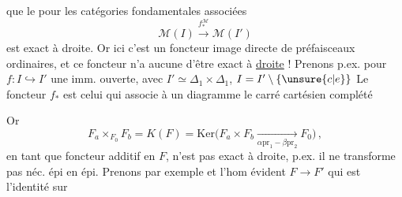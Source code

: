 que le  pour les catégories fondamentales associées
\[
\mathcal M(I)\xrightarrow{f_*^{\mathcal M}}\mathcal M(I')
\]
est exact à droite. Or ici c'est un foncteur image directe de préfaisceaux ordinaires, et ce foncteur n'a aucune  d'être exact à \uline{droite} !
\margin{$!\ \shortparallel$}
 
Prenons p.ex. pour $f:I\hookrightarrow I'$ une imm. ouverte, avec $I'\simeq\Delta_1\times\Delta_1$, $I=I'\setminus\{\unsure{c|e}\}$ 
Le foncteur $f_*$ est celui qui associe à un diagramme
le carré cartésien complété

Or
\[
F_a\times_{F_0}F_b=K(F)=\mathrm{Ker}\big(F_a\times F_b\xrightarrow[\alpha\mathrm{pr}_1-\beta\mathrm{pr}_2]{}F_0\big)\,,
\]
en tant que foncteur additif en $F$, n'est pas exact à droite, p.ex. il ne transforme pas néc. épi en épi. Prenons par exemple
et l'hom évident $F\longrightarrow F'$ qui est l'identité sur
